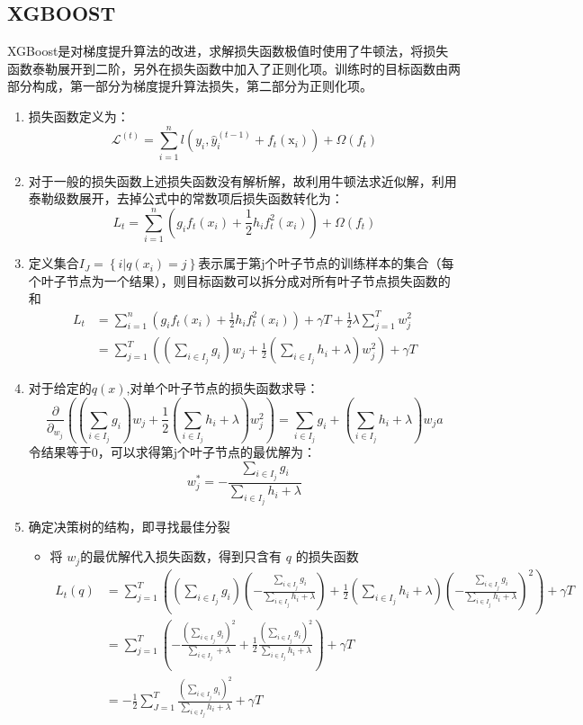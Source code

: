 \documentclass[UTF8]{article}%
\begin{document}
		\subsection{XGBOOST}
		XGBoost是对梯度提升算法的改进，求解损失函数极值时使用了牛顿法，将损失函数泰勒展开到二阶，另外在损失函数中加入了正则化项。训练时的目标函数由两部分构成，第一部分为梯度提升算法损失，第二部分为正则化项。
		\begin{enumerate}
			\item 损失函数定义为：$$\mathcal{L}^{(t)}=\sum_{i=1}^{n} l\left(y_{i}, \hat{y}_{i}^{(t-1)}+f_{t}\left(\mathrm{x}_{i}\right)\right)+\Omega\left(f_{t}\right)$$
			\item 对于一般的损失函数上述损失函数没有解析解，故利用牛顿法求近似解，利用泰勒级数展开，去掉公式中的常数项后损失函数转化为：
			$$
			L_{t}=\sum_{i=1}^{n}\left(g_{i} f_{t}\left(x_{i}\right)+\frac{1}{2} h_{i} f_{t}^{2}\left(x_{i}\right)\right)+\Omega\left(f_{t}\right)
			$$
			\item 定义集合$I_{J}=\left\{i | q\left(x_{i}\right)=j\right\}$表示属于第j个叶子节点的训练样本的集合（每个叶子节点为一个结果），则目标函数可以拆分成对所有叶子节点损失函数的和
			$$
			\begin{aligned} L_{t} &=\sum_{i=1}^{n}\left(g_{i} f_{t}\left(x_{i}\right)+\frac{1}{2} h_{i} f_{t}^{2}\left(x_{i}\right)\right)+\gamma T+\frac{1}{2} \lambda \sum_{j=1}^{T} w_{j}^{2} \\ &=\sum_{j=1}^{T}\left((\sum_{i \in I_{j}} g_{i}) w_{j}+\frac{1}{2}(\sum_{i \in I_{j}} h_{i}+\lambda) w_{j}^{2}\right)+\gamma T \end{aligned}
			$$
			\item 对于给定的$q(x)$,对单个叶子节点的损失函数求导：
			$$
			\frac{\partial}{\partial_{w_{j}}}\left((\sum_{i \in I_{j}} g_{i}) w_{j}+\frac{1}{2}(\sum_{i \in I_{j}} h_{i}+\lambda) w_{j}^{2}\right)=\sum_{i \in I_{j}} g_{i}+\left(\sum_{i \in I_{j}} h_{i}+\lambda\right) w_{j}a
			$$
			令结果等于0，可以求得第j个叶子节点的最优解为：
			$$w_{j}^{*}=-\frac{\sum_{i \in I_{j}} g_{i}}{\sum_{i \in I_{j}} h_{i}+\lambda}$$
			\item 确定决策树的结构，即寻找最佳分裂
				\begin{itemize}
					\item 将 $w_j $的最优解代入损失函数，得到只含有 $q$ 的损失函数
					\begin{equation}
					\begin{aligned} L_{t}(q) &=\sum_{j=1}^{T}\left((\sum_{i \in I_{j}} g_{i})(-\frac{\sum_{i \in I_{j}} g_{i}}{\sum_{i \in I_{j}} h_{i}+\lambda})+\frac{1}{2}(\sum_{i \in I_{j}} h_{i}+\lambda)(-\frac{\sum_{i \in I_{j}} g_{i}}{\sum_{i \in I_{j}} h_{i}+\lambda})^{2}\right)+\gamma T \\ &=\sum_{j=1}^{T}\left(-\frac{\left(\sum_{i \in I_{j}} g_{i}\right)^{2}}{\sum_{i \in I_{j}}+\lambda}+\frac{1}{2} \frac{\left(\sum_{i \in I_{j}} g_{i}\right)^{2}}{\sum_{i \in I_{j}} h_{i}+\lambda}\right)+\gamma T \\ &=-\frac{1}{2} \sum_{J=1}^{T} \frac{\left(\sum_{i \in I_{j}} g_{i}\right)^{2}}{\sum_{i \in I_{j}} h_{i}+\lambda}+\gamma T \end{aligned}

\end{equation}
\end{itemize}
\end{enumerate}
\end{document}
